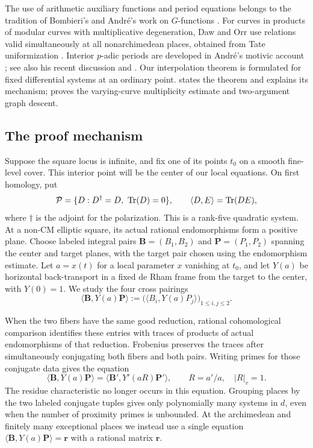 The use of arithmetic auxiliary functions and period equations belongs
to the tradition of Bombieri's and Andr\'e's work on $G$-functions
\cite{Bombieri1981,Andre1989}. For curves in products of modular curves
with multiplicative degeneration, Daw and Orr use relations valid
simultaneously at all nonarchimedean places, obtained from Tate
uniformization \cite[\S1.B]{DawOrrModular2025}.
Interior $p$-adic periods are developed
in Andr\'e's motivic account \cite{Andre1995}; see also his recent
discussion \cite[\S\S2.2 and 3.3.4]{AndreSurvey2025} and
\cite[Theorem~3.4]{PapasGFunctionsI2025}. Our interpolation theorem
is formulated for fixed differential systems at an ordinary point.
 states the theorem and explains its mechanism;
 proves the varying-curve multiplicity estimate and
two-argument graph descent.

\subsection{The proof mechanism}

Suppose the square locus is infinite, and fix one of its points $t_0$
on a smooth fine-level cover. This interior point will be the center of
our local equations. On first homology, put
\[
 \mathcal P=\{D:D^\dagger=D,\ \operatorname{Tr}(D)=0\},\qquad
 \langle D,E\rangle=\operatorname{Tr}(DE),
\]
where $\dagger$ is the adjoint for the polarization. This is a rank-five
quadratic system. At a non-CM elliptic square, its actual rational
endomorphisms form a positive plane. Choose labeled integral pairs
$\mathbf B=(B_1,B_2)$ and $\mathbf P=(P_1,P_2)$ spanning the center and
target planes, with the target pair chosen using the endomorphism
estimate. Let $a=x(t)$ for a local parameter $x$ vanishing at $t_0$,
and let $Y(a)$ be horizontal back-transport in a fixed de Rham frame
from the target to the center, with $Y(0)=1$. We study the four cross
pairings
\[
 \langle\mathbf B,Y(a)\mathbf P\rangle
   :=\bigl(\langle B_i,Y(a)P_j\rangle\bigr)_{1\leq i,j\leq2}.
\]

When the two fibers have the same good reduction, rational cohomological
comparison identifies these entries with traces of products of actual
endomorphisms of that reduction. Frobenius preserves the traces after
simultaneously conjugating both fibers and both pairs. Writing primes
for those conjugate data gives the equation
\[
 \langle\mathbf B,Y(a)\mathbf P\rangle
   =\langle\mathbf B',Y'(aR)\mathbf P'\rangle,
 \qquad R=a'/a,\quad |R|_v=1.
\]
The residue characteristic no longer occurs in this equation. Grouping
places by the two labeled conjugate tuples gives only polynomially many
systems in $d$, even when the number of proximity primes is unbounded.
At the archimedean and finitely many exceptional places we instead use
a single equation $\langle\mathbf B,Y(a)\mathbf P\rangle=\mathbf r$
with a rational matrix $\mathbf r$.

